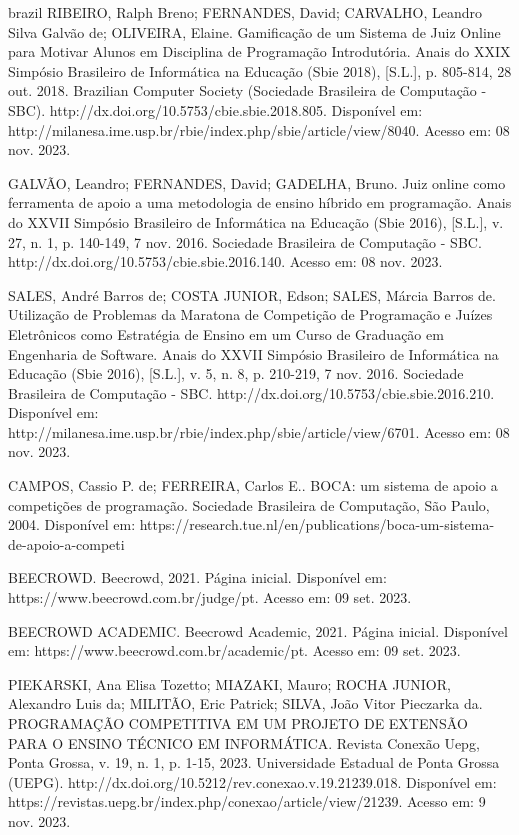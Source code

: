 \begin{otherlanguage*}{brazil}
RIBEIRO, Ralph Breno; FERNANDES, David; CARVALHO, Leandro Silva Galvão de; OLIVEIRA, Elaine. Gamificação de um Sistema de Juiz Online para Motivar Alunos em Disciplina de Programação Introdutória. Anais do XXIX Simpósio Brasileiro de Informática na Educação (Sbie 2018), [S.L.], p. 805-814, 28 out. 2018. Brazilian Computer Society (Sociedade Brasileira de Computação - SBC). http://dx.doi.org/10.5753/cbie.sbie.2018.805. Disponível em: http://milanesa.ime.usp.br/rbie/index.php/sbie/article/view/8040. Acesso em: 08 nov. 2023.

GALVÃO, Leandro; FERNANDES, David; GADELHA, Bruno. Juiz online como ferramenta de apoio a uma metodologia de ensino híbrido em programação. Anais do XXVII Simpósio Brasileiro de Informática na Educação (Sbie 2016), [S.L.], v. 27, n. 1, p. 140-149, 7 nov. 2016. Sociedade Brasileira de Computação - SBC. http://dx.doi.org/10.5753/cbie.sbie.2016.140. Acesso em: 08 nov. 2023.

SALES, André Barros de; COSTA JUNIOR, Edson; SALES, Márcia Barros de. Utilização de Problemas da Maratona de Competição de Programação e Juízes Eletrônicos como Estratégia de Ensino em um Curso de Graduação em Engenharia de Software. Anais do XXVII Simpósio Brasileiro de Informática na Educação (Sbie 2016), [S.L.], v. 5, n. 8, p. 210-219, 7 nov. 2016. Sociedade Brasileira de Computação - SBC. http://dx.doi.org/10.5753/cbie.sbie.2016.210. Disponível em: http://milanesa.ime.usp.br/rbie/index.php/sbie/article/view/6701. Acesso em: 08 nov. 2023.

CAMPOS, Cassio P. de; FERREIRA, Carlos E.. BOCA: um sistema de apoio a competições de programação. Sociedade Brasileira de Computação, São Paulo, 2004. Disponível em: https://research.tue.nl/en/publications/boca-um-sistema-de-apoio-a-competi%

BEECROWD. Beecrowd,  2021.  Página  inicial.  Disponível  em:  https://www.beecrowd.com.br/judge/pt.  Acesso em: 09 set. 2023.

BEECROWD ACADEMIC. Beecrowd Academic,  2021.  Página  inicial.  Disponível  em:  https://www.beecrowd.com.br/academic/pt.  Acesso em: 09 set. 2023.

PIEKARSKI, Ana Elisa Tozetto; MIAZAKI, Mauro; ROCHA JUNIOR, Alexandro Luis da; MILITÃO, Eric Patrick; SILVA, João Vitor Pieczarka da. PROGRAMAÇÃO COMPETITIVA EM UM PROJETO DE EXTENSÃO PARA O ENSINO TÉCNICO EM INFORMÁTICA. Revista Conexão Uepg, Ponta Grossa, v. 19, n. 1, p. 1-15, 2023. Universidade Estadual de Ponta Grossa (UEPG). http://dx.doi.org/10.5212/rev.conexao.v.19.21239.018. Disponível em: https://revistas.uepg.br/index.php/conexao/article/view/21239. Acesso em: 9 nov. 2023.


\end{otherlanguage*}
